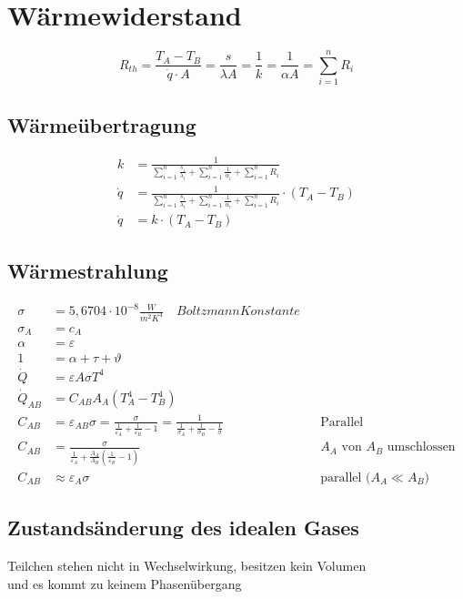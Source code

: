 \section{Wärmewiderstand}
\[R_{th}=\frac{T_A-T_B}{\dot{q}\cdot A}=\frac{s}{\lambda A}=\frac{1}{k}=\frac{1}{\alpha
A}=\sum_{i=1}^n R_{i}\]

\subsection{Wärmeübertragung}
\begin{align*}
k&=\frac{1}{\sum_{i=1}^n\frac{s_i}{\lambda_i}+\sum_{i=1}^n\frac{1}{\alpha_i}+\sum_{i=1}^n R_{i}}\\
\dot{q}&=\frac{1}{\sum_{i=1}^n\frac{s_i}{\lambda_i}+\sum_{i=1}^n\frac{1}{\alpha_i}+\sum_{i=1}^n R_{i}}\cdot\left(T_A-T_B\right)\\
\dot{q}&=k\cdot\left(T_A-T_B\right)
\end{align*}

\subsection{Wärmestrahlung}
\begin{align*}
\sigma &= 5,6704\cdot 10^{-8} \frac{W}{m^2 K^4} \quad Boltzmann Konstante\\
\sigma_A &= c_A\\
\alpha&=\varepsilon\\
1&=\alpha+\tau+\vartheta\\
\dot{Q}&=\varepsilon A \sigma T^4\\
\dot{Q}_{AB}&=C_{AB}A_A\left(T_A^4-T_B^4\right)\\
C_{AB}&=\varepsilon_{AB}\sigma=\frac{\sigma}{\frac{1}{\varepsilon_A}+\frac{1}{\varepsilon_B}-1}=\frac{1}{\frac{1}{\sigma_A}+\frac{1}{\sigma_B}-\frac{1}{\sigma}}&&\text{Parallel}\\
C_{AB}&=\frac{\sigma}{\frac{1}{\varepsilon_A}+\frac{A_A}{A_B}\left(\frac{1}{\varepsilon_B}-1\right)}&&\text{$A_A$ von $A_B$ umschlossen}\\
C_{AB}&\approx\varepsilon_A\sigma&&\text{parallel ($A_A\ll A_B$)}
\end{align*}

\subsection{Zustandsänderung des idealen Gases}
Teilchen stehen nicht in Wechselwirkung, besitzen kein Volumen \\ und es kommt zu keinem Phasenübergang

